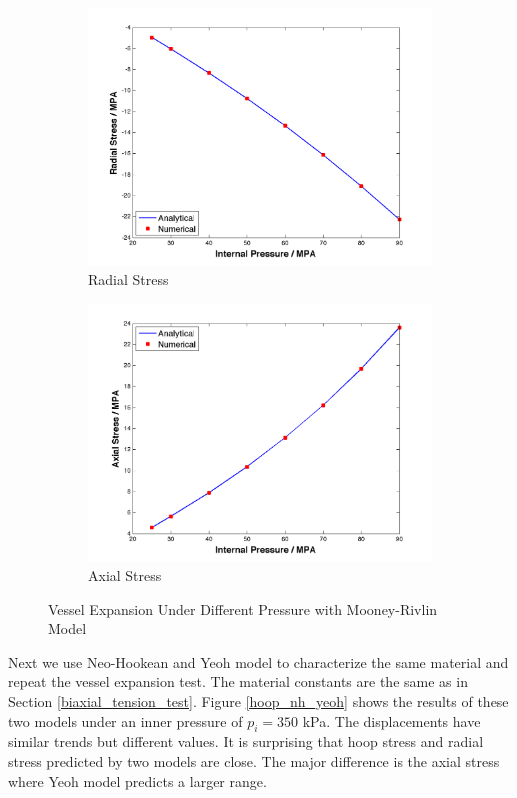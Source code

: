 \begin{figure}[t!p]
	\begin{subfigure}[b]{0.5\textwidth}
		\centering
		\includegraphics[width=\textwidth]{./figures/radial.png}
		\caption{Radial Stress}
		\label{radial}
	\end{subfigure}
	\begin{subfigure}[b]{0.5\textwidth}
		\centering
		\includegraphics[width=\textwidth]{./figures/axial.png}
		\caption{Axial Stress}
		\label{axial}
	\end{subfigure}
	\caption{Vessel Expansion Under Different Pressure with Mooney-Rivlin Model}
	\label{fig:mooney-rivlin2}
\end{figure}

Next we use Neo-Hookean and Yeoh model to characterize the same material and repeat the vessel expansion test. The material constants are the same as in Section \ref{biaxial_tension_test}. Figure \ref{hoop_nh_yeoh} shows the results of these two models under an inner pressure of $p_i = 350$ kPa. The displacements have similar trends but different values. It is surprising that hoop stress and radial stress predicted by two models are close. The major difference is the axial stress where Yeoh model predicts a larger range.

